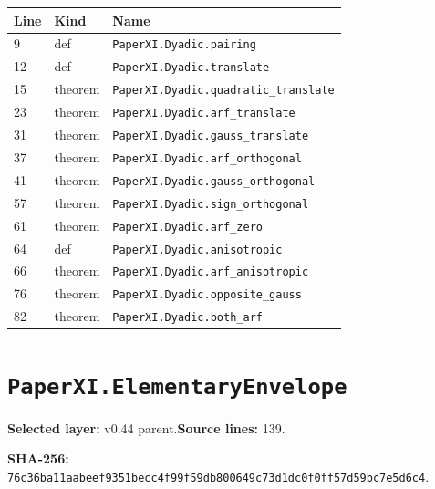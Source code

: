 \documentclass[10pt,oneside]{book}
\begin{document}
\begin{longtable}{@{}p{}p{}p{}@{}}\toprule Line&Kind&Name\\\midrule\endhead

9&def&\nolinkurl{PaperXI.Dyadic.pairing}\\

12&def&\nolinkurl{PaperXI.Dyadic.translate}\\

15&theorem&\nolinkurl{PaperXI.Dyadic.quadratic_translate}\\

23&theorem&\nolinkurl{PaperXI.Dyadic.arf_translate}\\

31&theorem&\nolinkurl{PaperXI.Dyadic.gauss_translate}\\

37&theorem&\nolinkurl{PaperXI.Dyadic.arf_orthogonal}\\

41&theorem&\nolinkurl{PaperXI.Dyadic.gauss_orthogonal}\\

57&theorem&\nolinkurl{PaperXI.Dyadic.sign_orthogonal}\\

61&theorem&\nolinkurl{PaperXI.Dyadic.arf_zero}\\

64&def&\nolinkurl{PaperXI.Dyadic.anisotropic}\\

66&theorem&\nolinkurl{PaperXI.Dyadic.arf_anisotropic}\\

76&theorem&\nolinkurl{PaperXI.Dyadic.opposite_gauss}\\

82&theorem&\nolinkurl{PaperXI.Dyadic.both_arf}\\

\bottomrule\end{longtable}

\section{\texorpdfstring{\nolinkurl{PaperXI.ElementaryEnvelope}}{PaperXI.ElementaryEnvelope}}\label{module:PaperXI.ElementaryEnvelope}

\textbf{Selected layer:} v0.44 parent.\quad\textbf{Source lines:} 139.\par\textbf{SHA-256:} {\scriptsize\nolinkurl{76c36ba11aabeef9351becc4f99f59db800649c73d1dc0f0ff57d59bc7e5d6c4}}.
\end{document}
